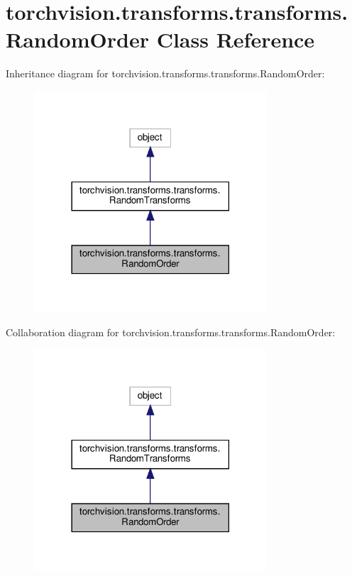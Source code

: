 \hypertarget{classtorchvision_1_1transforms_1_1transforms_1_1RandomOrder}{}\section{torchvision.\+transforms.\+transforms.\+Random\+Order Class Reference}
\label{classtorchvision_1_1transforms_1_1transforms_1_1RandomOrder}


Inheritance diagram for torchvision.\+transforms.\+transforms.\+Random\+Order\+:
\nopagebreak
\begin{figure}[H]
\begin{center}
\leavevmode
\includegraphics[width=246pt]{classtorchvision_1_1transforms_1_1transforms_1_1RandomOrder__inherit__graph}
\end{center}
\end{figure}


Collaboration diagram for torchvision.\+transforms.\+transforms.\+Random\+Order\+:
\nopagebreak
\begin{figure}[H]
\begin{center}
\leavevmode
\includegraphics[width=246pt]{classtorchvision_1_1transforms_1_1transforms_1_1RandomOrder__coll__graph}
\end{center}
\end{figure}
